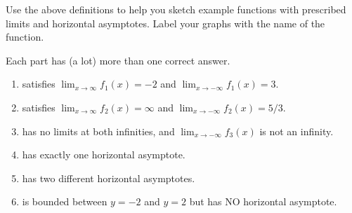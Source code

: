 \documentclass[../main.tex]{subfiles}
\begin{document}
  \begin{example}
    Use the above definitions to help you sketch example functions with prescribed limits and horizontal asymptotes. Label your graphs with the name of the function. 

    Each part has (a lot) more than one correct answer. 

    \begin{enumerate}[label=\(f_{\arabic*}\)]
      \item satisfies \(\lim_{x \to \infty} f_{1}(x) = -2\) and \(\lim_{x \to -\infty} f_{1}(x) = 3\).
      \item satisfies \(\lim_{x \to \infty} f_{2}(x) = \infty\) and \(\lim_{x \to -\infty} f_{2}(x) = 5/3\).
        \begin{center}
          
          \qquad
          
        \end{center}

      \item has no limits at both infinities, and \(\lim_{x \to -\infty} f_{3}(x)\) is not an infinity. 
      \item has exactly one horizontal asymptote.

        \begin{center}
          
          \qquad
          
        \end{center}

      \item has two different horizontal asymptotes.
      \item is bounded between \(y = -2\) and \(y = 2\) but has NO horizontal asymptote.

        \begin{center}
          
          \qquad
          
        \end{center}
    \end{enumerate}

  \end{example}
  \clearpage
\end{document}
